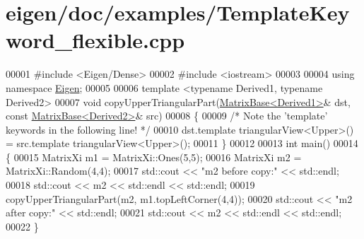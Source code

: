 \hypertarget{eigen_2doc_2examples_2_template_keyword__flexible_8cpp_source}{}\section{eigen/doc/examples/\+Template\+Keyword\+\_\+flexible.cpp}
\label{eigen_2doc_2examples_2_template_keyword__flexible_8cpp_source}

\begin{DoxyCode}
00001 \textcolor{preprocessor}{#include <Eigen/Dense>}
00002 \textcolor{preprocessor}{#include <iostream>}
00003 
00004 \textcolor{keyword}{using namespace }\hyperlink{namespace_eigen}{Eigen};
00005 
00006 \textcolor{keyword}{template} <\textcolor{keyword}{typename} Derived1, \textcolor{keyword}{typename} Derived2>
00007 \textcolor{keywordtype}{void} copyUpperTriangularPart(\hyperlink{group___core___module_class_eigen_1_1_matrix_base}{MatrixBase<Derived1>}& dst, \textcolor{keyword}{const} 
      \hyperlink{group___core___module_class_eigen_1_1_matrix_base}{MatrixBase<Derived2>}& src)
00008 \{
00009   \textcolor{comment}{/* Note the 'template' keywords in the following line! */}
00010   dst.template triangularView<Upper>() = src.template triangularView<Upper>();
00011 \}
00012 
00013 \textcolor{keywordtype}{int} main()
00014 \{
00015   MatrixXi m1 = MatrixXi::Ones(5,5);
00016   MatrixXi m2 = MatrixXi::Random(4,4);
00017   std::cout << \textcolor{stringliteral}{"m2 before copy:"} << std::endl;
00018   std::cout << m2 << std::endl << std::endl;
00019   copyUpperTriangularPart(m2, m1.topLeftCorner(4,4));
00020   std::cout << \textcolor{stringliteral}{"m2 after copy:"} << std::endl;
00021   std::cout << m2 << std::endl << std::endl;
00022 \}
\end{DoxyCode}
